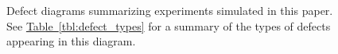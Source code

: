 \documentclass[onecolumn,unpublished,a4paper]{quantumarticle}
\theoremstyle{definition}
\theoremstyle{definition}
\theoremstyle{definition}
\newcommand{\tbl}[1]{\hyperref[tbl:#1]{Table~\ref*{tbl:#1}}}
\begin{document}
\begin{figure}
    \centering
    \caption{
        Defect diagrams summarizing experiments simulated in this paper.
        See \tbl{defect_types} for a summary of the types of defects appearing in this diagram.
    }
    \label{fig:experiment_defect_diagrams}
\end{figure}
\end{document}

